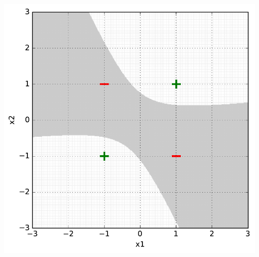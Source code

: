 \begin{examplebox}
  \begin{center}
    \includegraphics[scale=0.48]{figures/feature_representation_xor_order2.pdf}
  \end{center}
\end{examplebox}

